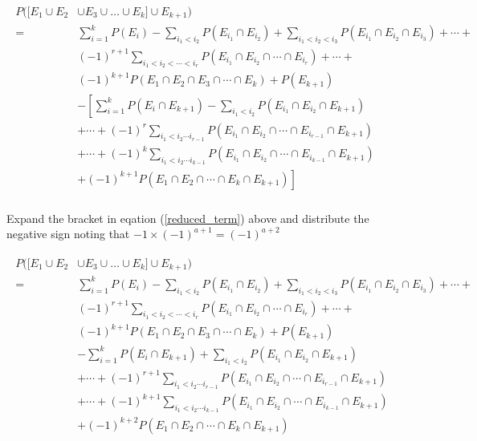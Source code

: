 \documentclass[a4paper]{article}
\begin{document}
    \begin{align}
        \begin{split} \label{reduced_term}
            P([E_1 \cup E_2 &\cup E_3 \cup \dots \cup E_k] \cup E_{k + 1}) \\
            = & \sum_{i = 1}^{k} P(E_i) - \sum_{i_1 < i_2} P(E_{i_1} \cap E_{i_2}) + \sum_{i_1 < i_2 < i_3} P(E_{i_1} \cap E_{i_2} \cap E_{i_3}) + \cdots + \\
            & {(-1)}^{r + 1} \sum_{i_1 < i_2 < \cdots < i_r} P(E_{i_1} \cap E_{i_2} \cap \cdots \cap E_{i_r}) + \cdots + \\
            & {(-1)}^{k + 1} P(E_1 \cap E_2 \cap E_3 \cap \cdots \cap E_k) + P(E_{k + 1}) \\
            & - \left[ \sum_{i = 1}^{k} P(E_i \cap E_{k + 1}) - \sum_{i_1 < i_2} P(E_{i_1} \cap E_{i_2} \cap E_{k + 1}) \right. \\
            & \left. + \cdots + {(-1)}^{r} \sum_{i_1 < i_2 \cdots i_{r - 1}} P(E_{i_1} \cap E_{i_2} \cap \cdots \cap E_{i_{r - 1}} \cap E_{k + 1}) \right. \\
            & \left. + \cdots + {(-1)}^{k} \sum_{i_1 < i_2 \cdots i_{k - 1}} P(E_{i_1} \cap E_{i_2} \cap \cdots \cap E_{i_{k - 1}} \cap E_{k + 1}) \right. \\
            & \left. + {(-1)}^{k + 1} P(E_1 \cap E_2 \cap \cdots \cap E_k \cap E_{k + 1}) \right] \\
        \end{split}
    \end{align}

    Expand the bracket in eqation (\ref{reduced_term}) above and distribute the negative sign noting that $-1 \times {(-1)}^{a + 1} = {(-1)}^{a + 2}$

    \begin{align}
        \begin{split} \label{expanded_term}
            P([E_1 \cup E_2 &\cup E_3 \cup \dots \cup E_k] \cup E_{k + 1}) \\
            = & \sum_{i = 1}^{k} P(E_i) - \sum_{i_1 < i_2} P(E_{i_1} \cap E_{i_2}) + \sum_{i_1 < i_2 < i_3} P(E_{i_1} \cap E_{i_2} \cap E_{i_3}) + \cdots + \\
            & {(-1)}^{r + 1} \sum_{i_1 < i_2 < \cdots < i_r} P(E_{i_1} \cap E_{i_2} \cap \cdots \cap E_{i_r}) + \cdots + \\
            & {(-1)}^{k + 1} P(E_1 \cap E_2 \cap E_3 \cap \cdots \cap E_k) + P(E_{k + 1}) \\
            & - \sum_{i = 1}^{k} P(E_i \cap E_{k + 1}) + \sum_{i_1 < i_2} P(E_{i_1} \cap E_{i_2} \cap E_{k + 1}) \\
            & + \cdots + {(-1)}^{r + 1} \sum_{i_1 < i_2 \cdots i_{r - 1}} P(E_{i_1} \cap E_{i_2} \cap \cdots \cap E_{i_{r - 1}} \cap E_{k + 1}) \\
            & + \cdots + {(-1)}^{k + 1} \sum_{i_1 < i_2 \cdots i_{k - 1}} P(E_{i_1} \cap E_{i_2} \cap \cdots \cap E_{i_{k - 1}} \cap E_{k + 1}) \\
            & + {(-1)}^{k + 2} P(E_1 \cap E_2 \cap \cdots \cap E_k \cap E_{k + 1}) \\
        \end{split}
    \end{align}
\end{document}
